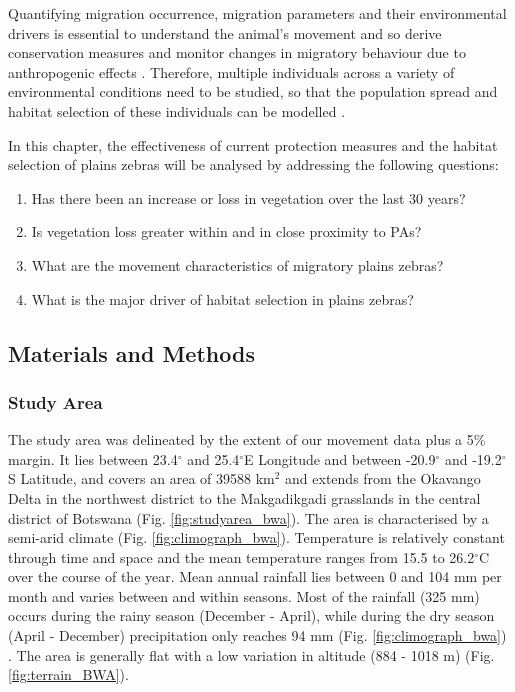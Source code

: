 \documentclass[12pt,a4paper, twoside, english]{article}
\begin{document}
Quantifying migration occurrence, migration parameters and their environmental drivers is essential to understand the animal's movement and so derive conservation measures and monitor changes in migratory behaviour due to anthropogenic effects \citep{Berger2004, Bolger2008, Wilcove2008, Katzner2012, Bauer2014, Naidoo2014}. Therefore, multiple individuals across a variety of environmental conditions need to be studied, so that the population spread and habitat selection of these individuals can be modelled \citep{Avgar2013}.


In this chapter, the effectiveness of current protection measures and the habitat selection of plains zebras will be analysed by addressing the following questions:

\begin{enumerate}
  \item Has there been an increase or loss in vegetation over the last 30 years?
  \item Is vegetation loss greater within and in close proximity to PAs?
  \item What are the movement characteristics of migratory plains zebras?
  \item What is the major driver of habitat selection in plains zebras?
\end{enumerate}

\newpage
\subsection{Materials and Methods}

\subsubsection{Study Area}

The study area was delineated by the extent of our movement data plus a 5\% margin. It lies between 23.4$^{\circ}$ and 25.4$^{\circ}$E Longitude and between -20.9$^{\circ}$ and -19.2$^{\circ}$S Latitude, and covers an area of 39588 km$^{2}$ and extends from the Okavango Delta in the northwest district to the Makgadikgadi grasslands in the central district of Botswana (Fig. \ref{fig:studyarea_bwa}). The area is characterised by a semi-arid climate (Fig. \ref{fig:climograph_bwa}). Temperature is relatively constant through time and space and the mean temperature ranges from 15.5 to 26.2$^{\circ}$C over the course of the year. Mean annual rainfall lies between 0 and 104 mm per month and varies between and within seasons. Most of the rainfall (325 mm) occurs during the rainy season (December - April), while during the dry season (April - December) precipitation only reaches 94 mm (Fig. \ref{fig:climograph_bwa}) \citep{Hijmans2005}. The area is generally flat with a low variation in altitude (884 - 1018 m) (Fig. \ref{fig:terrain_BWA}).
\end{document}
